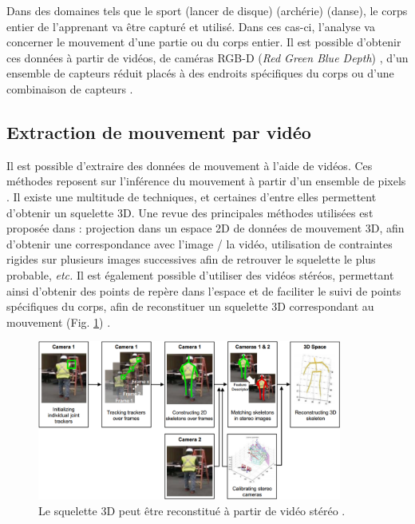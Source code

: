 Dans des domaines tels que le sport \parencite{YAMAOKA2013912} (lancer de disque) \parencite{Yoshinaga2015Doa} (archérie) \parencite{Chan2011} (danse), le corps entier de l'apprenant va être capturé et utilisé. Dans ces cas-ci, l'analyse va concerner le mouvement d'une partie ou du corps entier. Il est possible d'obtenir ces données à partir de vidéos, de caméras RGB-D (\textit{Red Green Blue Depth}) \parencite{Yoshinaga2015Doa} \parencite{Kora20151559} \parencite{YAMAOKA2013912}, d'un ensemble de capteurs réduit placés à des endroits spécifiques du corps \parencite{PORCIUNCULA2018S220} ou d'une combinaison de capteurs \parencite{Chang201379}.

\subsection{Extraction de mouvement par vidéo}
Il est possible d'extraire des données de mouvement à l'aide de vidéos. Ces méthodes reposent sur l'inférence du mouvement à partir d'un ensemble de pixels \parencite{Lv2015CEI}. Il existe une multitude de techniques, et certaines d'entre elles permettent d'obtenir un squelette 3D. Une revue des principales méthodes utilisées est proposée dans \parencite{Sarafianos2016DHp} : projection dans un espace 2D de données de mouvement 3D, afin d'obtenir une correspondance avec l'image / la vidéo, utilisation de contraintes rigides sur plusieurs images successives afin de retrouver le squelette le plus probable, \textit{etc.} Il est également possible d'utiliser des vidéos stéréos, permettant ainsi d'obtenir des points de repère dans l'espace et de faciliter le suivi de points spécifiques du corps, afin de reconstituer un squelette 3D correspondant au mouvement (Fig. \ref{fig:stereo_video_skeleton}) \parencite{Liu2016Tb3}.

\begin{figure}[h]
    \centering
    \includegraphics[width=10cm]{pictures/stereo_video_skeleton.png}
    \caption[Squelette reconstitué à partir de vidéo stéréo \parencite{Liu2016Tb3}]{Le squelette 3D peut être reconstitué à partir de vidéo stéréo \parencite{Liu2016Tb3}.}
    \label{fig:stereo_video_skeleton}
\end{figure}


